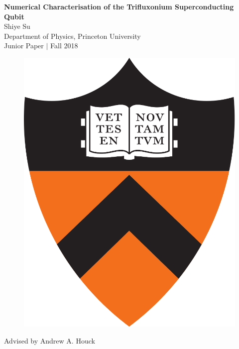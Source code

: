 \documentclass[11pt]{article}
\title{}
\author{}
\date{}
\begin{document}
\begin{titlepage}

\centering

\vspace*{1cm}
\LARGE{\textbf{Numerical Characterisation of the Trifluxonium Superconducting Qubit}} \\
\vspace*{0.5cm}
\Large{Shiye Su} \\
\Large{Department of Physics, Princeton University \\ Junior Paper $\vert$ Fall 2018\\}

\vspace*{1cm}

\begin{figure}[H]
\centering
\includegraphics[scale=0.1]{pton}
\end{figure}
\Large{Advised by Andrew A. Houck}\\



\vspace{1cm}


\end{titlepage}
\end{document}
